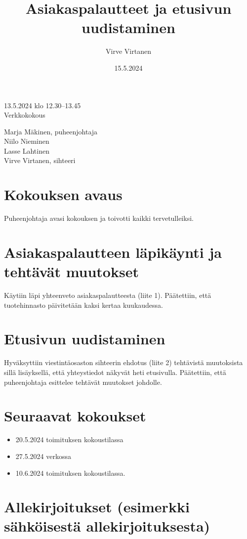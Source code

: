 \documentclass{sfs-2487-2024}
\date{15.5.2024}
\author{Virve Virtanen}
\title{Asiakaspalautteet ja etusivun uudistaminen}
\begin{document}
\maketitle


13.5.2024 klo 12.30--13.45\\
Verkkokokous


Marja Mäkinen, puheenjohtaja\\
Niilo Nieminen\\
Lasse Lahtinen\\
Virve Virtanen, sihteeri

\section{Kokouksen avaus}

Puheenjohtaja avasi kokouksen ja toivotti kaikki tervetulleiksi.

\section{Asiakaspalautteen läpikäynti ja tehtävät muutokset}

Käytiin läpi yhteenveto asiakaspalautteesta (liite 1). Päätettiin, että
tuotehinnasto päivitetään kaksi kertaa kuukaudessa.

\section{Etusivun uudistaminen}

Hyväksyttiin viestintäosaston sihteerin ehdotus (liite 2) tehtävistä
muutoksista sillä lisäyksellä, että yhteystiedot näkyvät heti etusivulla.
Päätettiin, että puheenjohtaja esittelee tehtävät muutokset johdolle.

\section{Seuraavat kokoukset}

\begin{itemize}
  \item 20.5.2024 toimituksen kokoustilassa
  \item 27.5.2024 verkossa
  \item 10.6.2024 toimituksen kokoustilassa.
\end{itemize}

\section{Allekirjoitukset (esimerkki sähköisestä allekirjoituksesta)}
\end{document}

